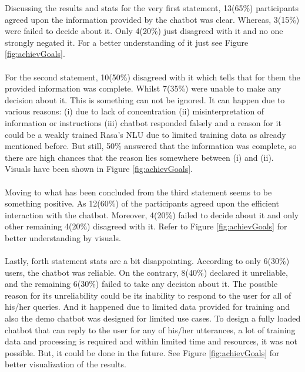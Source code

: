 \noindent
Discussing the results and stats for the very first statement, 13(65\%) participants agreed upon the information provided by the chatbot was clear. Whereas, 3(15\%) were failed to decide about it. Only 4(20\%) just disagreed with it and no one strongly negated it. For a better understanding of it just see Figure \ref{fig:achievGoals}.
\\~\\
For the second statement, 10(50\%) disagreed with it which tells that for them the provided information was complete. Whilst 7(35\%) were unable to make any decision about it. This is something can not be ignored. It can happen due to various reasons: (i) due to lack of concentration (ii) misinterpretation of information or instructions (iii) chatbot responded falsely and a reason for it could be a weakly trained Rasa's NLU due to limited training data as already mentioned before. But still, 50\% answered that the information was complete, so there are high chances that the reason lies somewhere between (i) and (ii). Visuals have been shown in Figure \ref{fig:achievGoals}.
\\~\\
Moving to what has been concluded from the third statement seems to be something positive. As 12(60\%) of the participants agreed upon the efficient interaction with the chatbot. Moreover, 4(20\%) failed to decide about it and only other remaining 4(20\%) disagreed with it. Refer to Figure \ref{fig:achievGoals} for better understanding by visuals.
\\~\\
Lastly, forth statement stats are a bit disappointing. According to only 6(30\%) users, the chatbot was reliable. On the contrary, 8(40\%) declared it unreliable, and the remaining 6(30\%) failed to take any decision about it. The possible reason for its unreliability could be its inability to respond to the user for all of his/her queries. And it happened due to limited data provided for training and also the demo chatbot was designed for limited use cases. To design a fully loaded chatbot that can reply to the user for any of his/her utterances, a lot of training data and processing is required and within limited time and resources, it was not possible. But, it could be done in the future. See Figure \ref{fig:achievGoals} for better visualization of the results.

